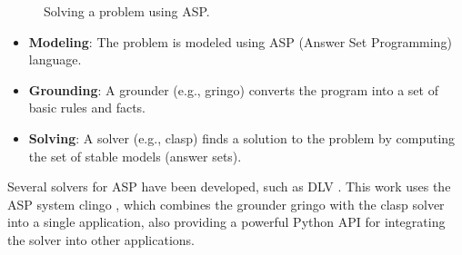 \documentclass[10pt,leqno]{amsart}
\begin{document}
\begin{figure}[htb]
    \begin{center}
    \end{center}
		\caption{Solving a problem using ASP.}
    \label{fig:asp-solving}
\end{figure}

\begin{itemize}
    \item \textbf{Modeling}: The problem is modeled using ASP (Answer Set Programming) language.
    \item \textbf{Grounding}: A grounder (e.g., gringo) converts the program into a set of basic rules and facts.
    \item \textbf{Solving}: A solver (e.g., clasp) finds a solution to the problem by computing the set of stable models (answer sets).
\end{itemize}

Several solvers for ASP have been developed, such as DLV \cite{Xia2020}. 
This work uses the ASP system clingo \cite{Gebser2014}, 
which combines the grounder gringo with the clasp solver \cite{Holldobler2014} 
into a single application, also providing a powerful Python API for integrating the solver into other applications.
\end{document}
